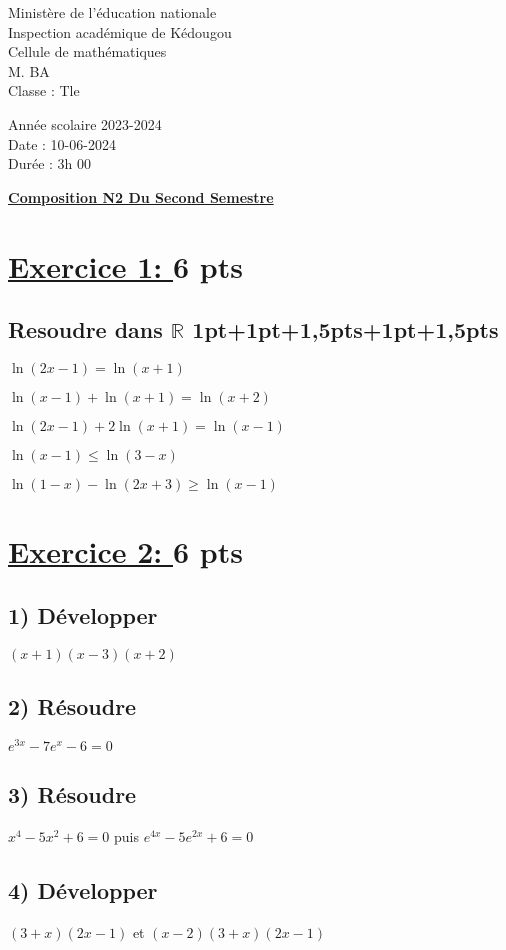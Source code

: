 \documentclass[12pt]{article}
\begin{document}
\begin{minipage}{0.5\textwidth}
	Ministère de l'éducation nationale  \\
	Inspection académique de Kédougou   \\
	Cellule de mathématiques            \\
	M. BA\\
	Classe : Tle  \\
\end{minipage}
\begin{minipage}{0.5\textwidth}
	Année scolaire 2023-2024 \\
	Date : 10-06-2024 \\
	Durée : 3h 00 \\
\end{minipage}

\begin{center}
	\textbf{{\underline{Composition N2 Du Second Semestre}}}
\end{center}
\section*{\underline{Exercice 1: }\textbf{6 pts}}
\subsection*{ Resoudre dans $\mathbb{R}$ 1pt+1pt+1,5pts+1pt+1,5pts}
$\ln(2x-1)=\ln(x+1)$

$\ln(x-1)+\ln(x+1)=\ln(x+2)$

$\ln(2x-1)+2\ln(x+1)=\ln(x-1)$

$\ln(x-1)\leq\ln(3-x)$

$\ln(1-x)-\ln(2x+3)\geq\ln(x-1)$
\section*{\underline{Exercice 2: }\textbf{6 pts}}
\subsection*{ 1) Développer } $(x+1)(x-3)(x+2)$
\subsection*{ 2) Résoudre } $e^{3x}-7e^{x}-6=0$
\subsection*{ 3) Résoudre } $x^{4}-5x^{2}+6=0$ puis $e^{4x}-5e^{2x}+6=0$
\subsection*{ 4) Développer } $(3+x)(2x-1)$ et $(x-2)(3+x)(2x-1)$
\end{document}
